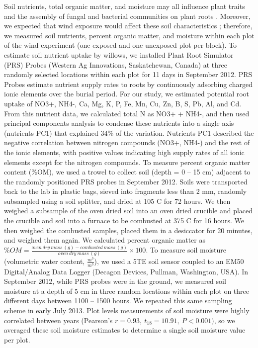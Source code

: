 \documentclass[11pt]{article}
\begin{document}
Soil nutrients, total organic matter, and moisture may all influence
plant traits and the assembly of fungal and bacterial communities on
plant roots \cite{Erlandson_2015}. Moreover, we expected that wind exposure
would affect these soil characteristics \cite{LORTIE_2007}; therefore, we
measured soil nutrients, percent organic matter, and moisture within
each plot of the wind experiment (one exposed and one unexposed plot per
block). To estimate soil nutrient uptake by willows, we installed Plant
Root Simulator (PRS) Probes (Western Ag Innovations, Saskatchewan,
Canada) at three randomly selected locations within each plot for 11
days in September 2012. PRS Probes estimate nutrient supply rates to
roots by continuously adsorbing charged ionic elements over the burial
period. For our study, we estimated potential root uptake of NO3+, NH4-,
Ca, Mg, K, P, Fe, Mn, Cu, Zn, B, S, Pb, Al, and Cd. From this nutrient
data, we calculated total N as NO3+ + NH4-, and then used principal
components analysis to condense these nutrients into a single axis
(nutrients PC1) that explained 34\% of the variation. Nutrients PC1
described the negative correlation between nitrogen compounds (NO3+,
NH4-) and the rest of the ionic elements, with positive values
indicating high supply rates of all ionic elements except for the
nitrogen compounds. To measure percent organic matter content (\%OM), we
used a trowel to collect soil (depth = 0 -- 15 cm) adjacent to the
randomly positioned PRS probes in September 2012. Soils were transported
back to the lab in plastic bags, sieved into fragments less than 2 mm,
randomly subsampled using a soil splitter, and dried at 105 \degree C
for 72 hours. We then weighed a subsample of the oven dried soil into an
oven dried crucible and placed the crucible and soil into a furnace to
be combusted at 375 \degree C for 16 hours. We then weighed the
combusted samples, placed them in a desiccator for 20 minutes, and
weighed them again. We calculated percent organic matter
as~\(\%OM=\frac{oven\ dry\ mass\ \left(g\right)-combusted\ mass\ \left(g\right)}{oven\ dry\ mass\ \left(g\right)}\times100\). To measure soil moisture (volumetric water content,
\(\frac{m^3}{m^3}\)), we used a 5TE soil sensor coupled to an EM50
Digital/Analog Data Logger (Decagon Devices, Pullman, Washington, USA).
In September 2012, while PRS probes were in the ground, we measured soil
moisture at a depth of 5 cm in three random locations within each plot
on three different days between 1100 -- 1500 hours. We repeated this
same sampling scheme in early July 2013. Plot levels measurements of
soil moisture were highly correlated between years (Pearson's
\(r=0.93,\ t_{18}=10.91,\ P<0.001)\), so we averaged these soil moisture estimates to
determine a single soil moisture value per plot.
\end{document}
